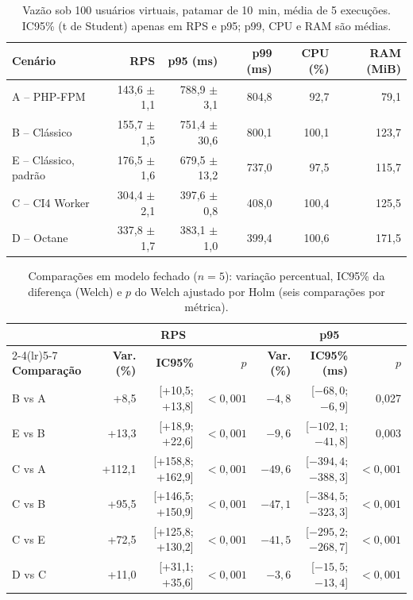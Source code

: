 \documentclass[sigconf, nonacm, screen, anonymous, language=portuguese, language=spanish, language={main=english}]{acmart}
\begin{document}
\begin{table}[htb]
  \caption{Vazão sob 100 usuários virtuais, patamar de 10~min, média de 5 execuções. IC95\% (t de Student) apenas em RPS e p95; p99, CPU e RAM são médias.}
  \label{tab:global}
  \centering
  \footnotesize
  \setlength{\tabcolsep}{3pt}
  \begin{tabular}{lrrrrr}
    \toprule
    \textbf{Cenário} & \textbf{RPS} & \textbf{p95 (ms)} & \textbf{p99 (ms)} & \textbf{CPU (\%)} & \textbf{RAM (MiB)} \\
    \midrule
    A -- PHP-FPM & 143,6 $\pm$ 1,1 & 788,9 $\pm$ 3,1 & 804,8 & 92,7 & 79,1 \\
    B -- Clássico & 155,7 $\pm$ 1,5 & 751,4 $\pm$ 30,6 & 800,1 & 100,1 & 123,7 \\
    E -- Clássico, padrão & 176,5 $\pm$ 1,6 & 679,5 $\pm$ 13,2 & 737,0 & 97,5 & 115,7 \\
    C -- CI4 Worker & 304,4 $\pm$ 2,1 & 397,6 $\pm$ 0,8 & 408,0 & 100,4 & 125,5 \\
    D -- Octane & 337,8 $\pm$ 1,7 & 383,1 $\pm$ 1,0 & 399,4 & 100,6 & 171,5 \\
    \bottomrule
  \end{tabular}
\end{table}

\begin{table}[htb]
  \caption{Comparações em modelo fechado ($n=5$): variação percentual, IC95\% da diferença (Welch) e $p$ do Welch ajustado por Holm (seis comparações por métrica).}
  \label{tab:pares}
  \centering
  \scriptsize
  \setlength{\tabcolsep}{2pt}
  \begin{tabular}{lrrrrrr}
    \toprule
    & \multicolumn{3}{c}{\textbf{RPS}} & \multicolumn{3}{c}{\textbf{p95}} \\
    \cmidrule(lr){2-4}\cmidrule(lr){5-7}
    \textbf{Comparação} & \textbf{Var. (\%)} & \textbf{IC95\%} & \textbf{$p$} & \textbf{Var. (\%)} & \textbf{IC95\% (ms)} & \textbf{$p$} \\
    \midrule
    B vs A & +8,5   & [+10,5; +13,8]   & $<0,001$ & $-4,8$  & [$-68,0$; $-6,9$]   & 0,027 \\
    E vs B & +13,3  & [+18,9; +22,6]   & $<0,001$ & $-9,6$  & [$-102,1$; $-41,8$] & 0,003 \\
    C vs A & +112,1 & [+158,8; +162,9] & $<0,001$ & $-49,6$ & [$-394,4$; $-388,3$] & $<0,001$ \\
    C vs B & +95,5  & [+146,5; +150,9] & $<0,001$ & $-47,1$ & [$-384,5$; $-323,3$] & $<0,001$ \\
    C vs E & +72,5  & [+125,8; +130,2] & $<0,001$ & $-41,5$ & [$-295,2$; $-268,7$] & $<0,001$ \\
    D vs C & +11,0  & [+31,1; +35,6]   & $<0,001$ & $-3,6$  & [$-15,5$; $-13,4$]  & $<0,001$ \\
    \bottomrule
  \end{tabular}
\end{table}
\end{document}

